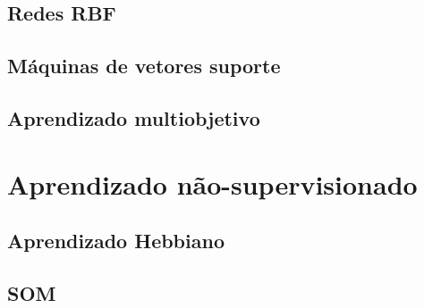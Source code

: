 \documentclass[conference]{IEEEtran}
\begin{document}
	\subsection{Redes RBF}

	\subsection{Máquinas de vetores suporte}
	\subsection{Aprendizado multiobjetivo}
	\section{Aprendizado não-supervisionado}
	\subsection{Aprendizado Hebbiano}
	\subsection{SOM}

\end{document}
